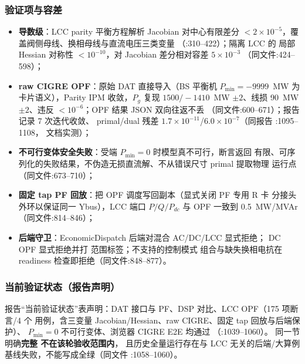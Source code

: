 \subsubsection*{验证项与容差}
\begin{itemize}
  \item \textbf{导数级}：LCC parity 平衡方程解析 Jacobian 对中心有限差分
        $<2\times10^{-5}$，覆盖阀侧母线、换相母线与直流电压三类变量
        （:310--422）；隔离 LCC 的
        局部 Hessian 对称性 $<10^{-10}$，对 Jacobian 差分相对容差 $5\times10^{-3}$
        （同文件:424--598）；
  \item \textbf{raw CIGRE OPF}：原始 DAT 直接导入（BS 平衡机 $P_{\min}=-9999$~MW
        为卡片语义），Parity IPM 收敛，$P_g$ 复现 $1500/-1410$~MW $\pm2$、线损
        90~MW $\pm2$、违反 $<10^{-6}$；OPF 结果 JSON 双向往返不丢
        （同文件:600--671）；报告记录 7 次迭代收敛、
        primal/dual 残差 $1.7\times10^{-11}$/$6.0\times10^{-7}$（同报告 :1095--1108，
        文档实测）；
  \item \textbf{不可行变体安全失败}：受端 $P_{\min}=0$ 时模型真不可行，断言返回
        有限、可序列化的失败结果，不伪造无损直流解、不从错误尺寸 primal 提取物理
        运行点（同文件:673--710）；
  \item \textbf{固定 tap PF 回放}：把 OPF 调度写回副本（显式关闭 PF 专用 R 卡
        分接头外环以保证同一 Ybus），LCC 端口 $P/Q/P_{dc}$ 与 OPF 一致到
        0.5~MW/MVAr（同文件:814--846）；
  \item \textbf{后端守卫}：EconomicDispatch 后端对混合 AC/DC/LCC 显式拒绝；
        DC OPF 显式拒绝并打  范围标签；不支持的控制模式
        组合与缺失换相电抗在 readiness 检查即拒绝（同文件:848--877）。
\end{itemize}

\subsubsection*{当前验证状态（报告声明）}
报告“当前验证状态”表声明：DAT 接口与 PF、DSP 对比、LCC OPF（175 项断言/4 个
用例，含三变量 Jacobian/Hessian、raw CIGRE、固定 tap 回放与后端保护）、
$P_{\min}=0$ 不可行变体、浏览器 CIGRE E2E 均通过
（:1039--1060）。
同一节明确\textbf{完整  不在该轮验收范围内}，
且历史全量运行存在与 LCC 无关的后端/大算例基线失败，不能写成全绿（同文件
:1058--1060）。


